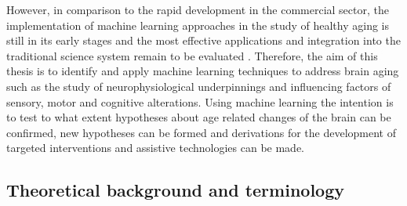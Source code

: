 However, in comparison to the rapid development in the commercial sector, the implementation of machine learning approaches in the study of healthy aging is still in its early stages and the most effective applications and integration into the traditional science system remain to be evaluated \cite{Bzdok2019}. Therefore, the aim of this thesis is to identify and apply machine learning techniques to address brain aging such as the study of neurophysiological underpinnings and influencing factors of sensory, motor and cognitive alterations. Using machine learning the intention is to test to what extent hypotheses about age related changes of the brain can be confirmed, new hypotheses can be formed and derivations for the development of targeted interventions and assistive technologies can be made.

\subsection{Theoretical background and terminology}








































